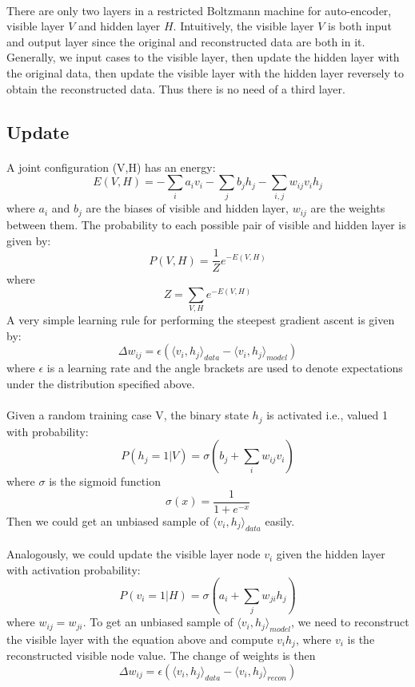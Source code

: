 \documentclass{article}
\begin{document}
\paragraph{}There are only two layers in a restricted Boltzmann machine for auto-encoder, visible layer $V$ and hidden layer $H$. Intuitively, the visible layer $V$ is both input and output layer since the original and reconstructed data  are both in it. Generally, we input cases to the visible layer, then update the hidden layer with the original data, then update the visible layer with the hidden layer reversely to obtain the reconstructed data. Thus there is no need of a third layer.
\subsection{Update}
\paragraph{}A joint configuration (V,H) has an energy:
\[E(V,H)=-\sum\limits_i a_i v_i-\sum\limits_jb_j h_j-\sum\limits_{i,j}w_{ij}v_i h_j\]
where $a_i$ and $b_j$ are the biases of visible and hidden layer, $w_{ij}$ are the weights between them. The probability to each possible pair of visible and hidden layer is given by:
\[P(V,H)=\frac1Ze^{-E(V,H)}\]
where \[Z=\sum\limits_{V,H}e^{-E(V,H)}\]
A very simple learning rule for performing the steepest gradient ascent is given by:
\[\Delta w_{ij}=\epsilon (\langle v_i,h_j\rangle_{data}-\langle v_i,h_j\rangle_{model})\]
where $\epsilon$ is a learning rate and the angle brackets are used to denote expectations under the distribution specified above.
\paragraph{}Given a random training case V, the binary state $h_j$ is activated i.e., valued 1 with probability:
\[P(h_j=1|V)=\sigma(b_j+\sum\limits_iw_{ij}v_i)\]
where $\sigma$ is the sigmoid function
\[\sigma(x)=\frac1{1+e^{-x}}\]
Then we could get an unbiased sample of $\langle v_i,h_j\rangle_{data}$ easily.
\paragraph{}
Analogously, we could update the visible layer node $v_i$ given the hidden layer with activation probability:
\[P(v_i=1|H)=\sigma(a_i+\sum\limits_jw_{ji}h_j)\]
where $w_{ij}=w_{ji}$.
To get an unbiased sample of $\langle v_i,h_j\rangle_{model}$, we need to reconstruct the visible layer with the equation above and compute $v_ih_j$, where $v_i$ is the reconstructed visible node value. The change of weights is then
\[\Delta w_{ij}=\epsilon (\langle v_i,h_j\rangle_{data}-\langle v_i,h_j\rangle_{recon})\]
\end{document}
